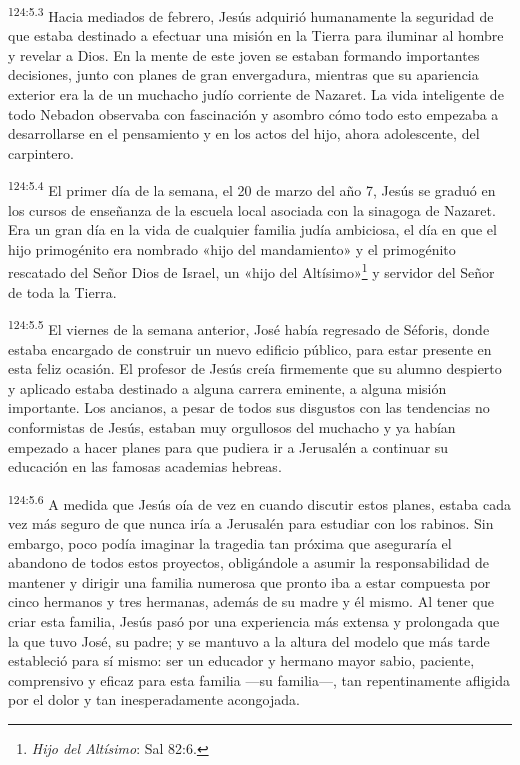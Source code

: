 \par 
\textsuperscript{124:5.3} Hacia mediados de febrero, Jesús adquirió humanamente la seguridad de que estaba destinado a efectuar una misión en la Tierra para iluminar al hombre y revelar a Dios. En la mente de este joven se estaban formando importantes decisiones, junto con planes de gran envergadura, mientras que su apariencia exterior era la de un muchacho judío corriente de Nazaret. La vida inteligente de todo Nebadon observaba con fascinación y asombro cómo todo esto empezaba a desarrollarse en el pensamiento y en los actos del hijo, ahora adolescente, del carpintero.

\par 
\textsuperscript{124:5.4} El primer día de la semana, el 20 de marzo del año 7, Jesús se graduó en los cursos de enseñanza de la escuela local asociada con la sinagoga de Nazaret. Era un gran día en la vida de cualquier familia judía ambiciosa, el día en que el hijo primogénito era nombrado «hijo del mandamiento» y el primogénito rescatado del Señor Dios de Israel, un «hijo del Altísimo»\footnote{\textit{Hijo del Altísimo}: Sal 82:6.} y servidor del Señor de toda la Tierra.

\par 
\textsuperscript{124:5.5} El viernes de la semana anterior, José había regresado de Séforis, donde estaba encargado de construir un nuevo edificio público, para estar presente en esta feliz ocasión. El profesor de Jesús creía firmemente que su alumno despierto y aplicado estaba destinado a alguna carrera eminente, a alguna misión importante. Los ancianos, a pesar de todos sus disgustos con las tendencias no conformistas de Jesús, estaban muy orgullosos del muchacho y ya habían empezado a hacer planes para que pudiera ir a Jerusalén a continuar su educación en las famosas academias hebreas.

\par 
\textsuperscript{124:5.6} A medida que Jesús oía de vez en cuando discutir estos planes, estaba cada vez más seguro de que nunca iría a Jerusalén para estudiar con los rabinos. Sin embargo, poco podía imaginar la tragedia tan próxima que aseguraría el abandono de todos estos proyectos, obligándole a asumir la responsabilidad de mantener y dirigir una familia numerosa que pronto iba a estar compuesta por cinco hermanos y tres hermanas, además de su madre y él mismo. Al tener que criar esta familia, Jesús pasó por una experiencia más extensa y prolongada que la que tuvo José, su padre; y se mantuvo a la altura del modelo que más tarde estableció para sí mismo: ser un educador y hermano mayor sabio, paciente, comprensivo y eficaz para esta familia ---su familia---, tan repentinamente afligida por el dolor y tan inesperadamente acongojada.

